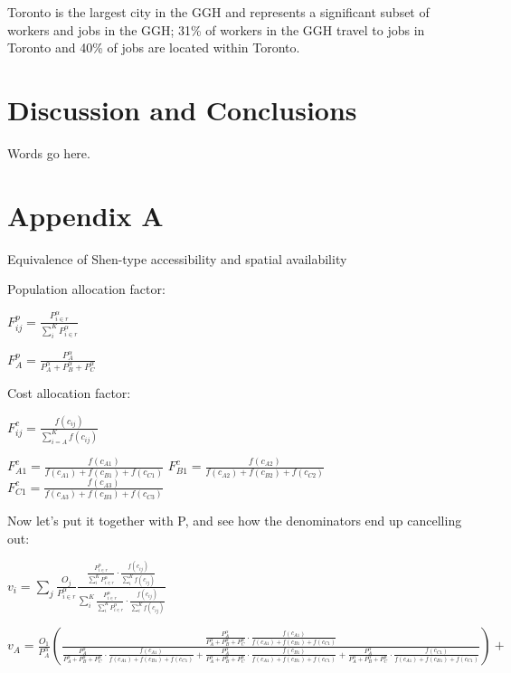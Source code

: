 \documentclass[]{elsarticle} %
\begin{document}
Toronto is the largest city in the GGH and represents a significant
subset of workers and jobs in the GGH; 31\% of workers in the GGH travel
to jobs in Toronto and 40\% of jobs are located within Toronto.

\newpage

\hypertarget{discussion-and-conclusions}{%
\section{Discussion and Conclusions}\label{discussion-and-conclusions}}

Words go here.

\hypertarget{appendix-a}{%
\section{Appendix A}\label{appendix-a}}

Equivalence of Shen-type accessibility and spatial availability

Population allocation factor:

\(F^p_{ij} = \frac{P_{i\in r}^\alpha}{\sum_{i}^K P_{i\in r}^\alpha}\)

\(F^p_{A} = \frac{P_{A}^\alpha}{P_{A}^\alpha + P_{B}^\alpha + P_{C}^\alpha}\)

Cost allocation factor:

\(F^c_{ij} = \frac{f(c_{ij})}{\sum_{i=A}^K f(c_{ij})}\)

\(F^c_{A1} = \frac{f(c_{A1})}{f(c_{A1})+f(c_{B1})+f(c_{C1})}\)
\(F^c_{B1} = \frac{f(c_{A2})}{f(c_{A2})+f(c_{B2})+f(c_{C2})}\)
\(F^c_{C1} = \frac{f(c_{A3})}{f(c_{A3})+f(c_{B3})+f(c_{C3})}\)

Now let's put it together with P, and see how the denominators end up
cancelling out:

\(v_{i} = \sum_{j}\frac{O_j}{P_{i\in r}^\alpha}\frac{\frac{P_{i\in r}^\alpha}{\sum_{i}^K P_{i\in r}^\alpha} \cdot \frac{f(c_{ij})}{\sum_{i}^K f(c_{ij})}}{\sum_{i}^K \frac{P_{i\in r}^\alpha}{\sum_{i}^K P_{i\in r}^\alpha} \cdot \frac{f(c_{ij})}{\sum_{i}^K f(c_{ij})}}\)

\(v_{A} = \frac{O_1}{P_{A}^\alpha}(\frac{\frac{P_{A}^\alpha}{P_{A}^\alpha+P_{B}^\alpha+P_{C}^\alpha} \cdot \frac{f(c_{A1})}{f(c_{A1})+f(c_{B1})+f(c_{C1})}}{\frac{P_{A}^\alpha}{P_{A}^\alpha+P_{B}^\alpha+P_{C}^\alpha} \cdot \frac{f(c_{A1})}{f(c_{A1})+f(c_{B1})+f(c_{C1})} + \frac{P_{A}^\alpha}{P_{A}^\alpha+P_{B}^\alpha+P_{C}^\alpha} \cdot \frac{f(c_{B1})}{f(c_{A1})+f(c_{B1})+f(c_{C1})}+ \frac{P_{A}^\alpha}{P_{A}^\alpha+P_{B}^\alpha+P_{C}^\alpha} \cdot \frac{f(c_{C1})}{f(c_{A1})+f(c_{B1})+f(c_{C1})}}) +\)
\end{document}
